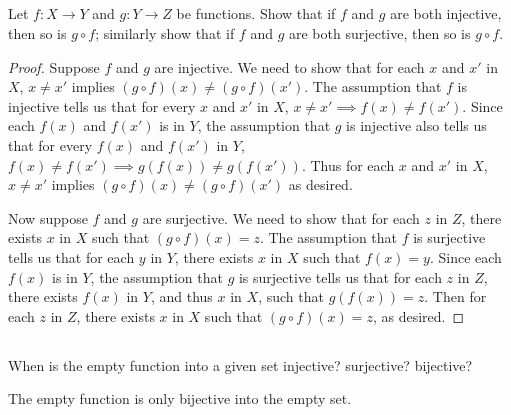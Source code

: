 \documentclass[../../main.tex]{subfiles}
\begin{document}

\addtocounter{subsection}{1}
\subsection{}
\begin{q}
    Let $f : X \to Y$ and $g : Y \to Z$ be functions. Show that if $f$ and $g$ are both injective, then so is $g \circ f$; similarly show that if $f$ and $g$ are both surjective, then so is $g \circ f$.
\end{q}

\begin{proof}
    Suppose $f$ and $g$ are injective.
    We need to show that for each $x$ and $x'$ in $X$, $x \neq x'$ implies $(g \circ f)(x) \neq (g \circ f)(x')$.
    The assumption that $f$ is injective tells us that for every $x$ and $x'$ in $X$, $x \neq x' \implies f(x) \neq f(x')$.
    Since each $f(x)$ and $f(x')$ is in $Y$, the assumption that $g$ is injective also tells us that for every $f(x)$ and $f(x')$ in $Y$, $f(x) \neq f(x') \implies g(f(x)) \neq g(f(x'))$.
    Thus for each $x$ and $x'$ in $X$, $x \neq x'$ implies $(g \circ f)(x) \neq (g \circ f)(x')$ as desired.
    
    Now suppose $f$ and $g$ are surjective.
    We need to show that for each $z$ in $Z$, there exists $x$ in $X$ such that $(g \circ f)(x)=z$.
    The assumption that $f$ is surjective tells us that for each $y$ in $Y$, there exists $x$ in $X$ such that $f(x)=y$.
    Since each $f(x)$ is in $Y$, the assumption that $g$ is surjective tells us that for each $z$ in $Z$, there exists $f(x)$ in $Y$, and thus $x$ in $X$, such that $g(f(x))=z$. Then for each $z$ in $Z$, there exists $x$ in $X$ such that $(g \circ f)(x)=z$, as desired. 
\end{proof}

\subsection{}
\begin{q}
    When is the empty function into a given set injective? surjective? bijective?
\end{q}

\begin{ans}
    The empty function is only bijective into the empty set.
\end{ans}
\end{document}
